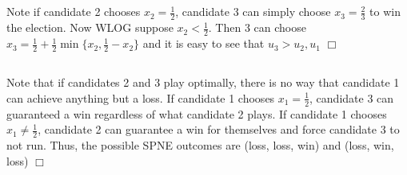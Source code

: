 \documentclass{article}
\begin{document}
\subsection{}
Note if candidate 2 chooses $x_2 = \frac{1}{2}$, candidate 3 can simply choose $x_3 = \frac{2}{3}$ to win the election. Now WLOG suppose $x_2 < \frac{1}{2}$. Then 3 can choose $x_3 = \frac{1}{2} + \frac{1}{2}\min\{x_2,\frac{1}{2}-x_2\}$ and it is easy to see that $u_3 > u_2, u_1$ $\Box$
\subsection{}
Note that if candidates 2 and 3 play optimally, there is no way that candidate 1 can achieve anything but a loss. If candidate 1 chooses $x_1 = \frac{1}{2}$, candidate 3 can guaranteed a win regardless of what candidate 2 plays. If candidate 1 chooses $x_1 \neq \frac{1}{2}$, candidate 2 can guarantee a win for themselves and force candidate 3 to not run. Thus, the possible SPNE outcomes are (loss, loss, win) and (loss, win, loss) $\Box$
\end{document}
